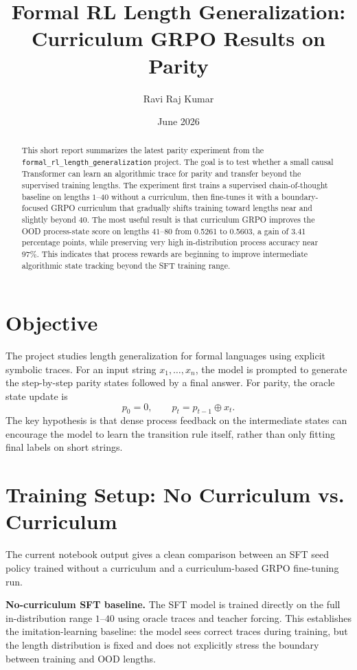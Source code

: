 \documentclass[11pt]{article}
\title{Formal RL Length Generalization: Curriculum GRPO Results on Parity}
\author{Ravi Raj Kumar}
\date{June 2026}
\begin{document}
\maketitle

\begin{abstract}
This short report summarizes the latest parity experiment from the \texttt{formal\_rl\_length\_generalization} project. The goal is to test whether a small causal Transformer can learn an algorithmic trace for parity and transfer beyond the supervised training lengths. The experiment first trains a supervised chain-of-thought baseline on lengths $1$--$40$ without a curriculum, then fine-tunes it with a boundary-focused GRPO curriculum that gradually shifts training toward lengths near and slightly beyond 40. The most useful result is that curriculum GRPO improves the OOD process-state score on lengths $41$--$80$ from 0.5261 to 0.5603, a gain of 3.41 percentage points, while preserving very high in-distribution process accuracy near 97\%. This indicates that process rewards are beginning to improve intermediate algorithmic state tracking beyond the SFT training range.
\end{abstract}

\section{Objective}
The project studies length generalization for formal languages using explicit symbolic traces. For an input string $x_1,\ldots,x_n$, the model is prompted to generate the step-by-step parity states followed by a final answer. For parity, the oracle state update is
\[
p_0=0, \qquad p_t=p_{t-1}\oplus x_t.
\]
The key hypothesis is that dense process feedback on the intermediate states can encourage the model to learn the transition rule itself, rather than only fitting final labels on short strings.

\section{Training Setup: No Curriculum vs. Curriculum}
The current notebook output gives a clean comparison between an SFT seed policy trained without a curriculum and a curriculum-based GRPO fine-tuning run.

\textbf{No-curriculum SFT baseline.} The SFT model is trained directly on the full in-distribution range $1$--$40$ using oracle traces and teacher forcing. This establishes the imitation-learning baseline: the model sees correct traces during training, but the length distribution is fixed and does not explicitly stress the boundary between training and OOD lengths.
\end{document}
